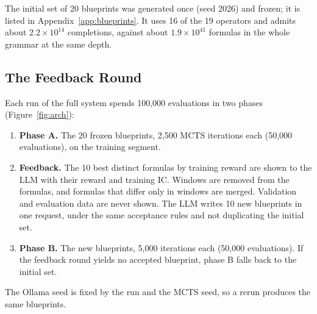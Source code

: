 \documentclass[12pt,a4paper,oneside]{book}
\theoremstyle{definition}
\begin{document}
The initial set of 20 blueprints was generated once (seed 2026) and frozen; it is listed in Appendix~\ref{app:blueprints}. It uses 16 of the 19 operators and admits about $2.2 \times 10^{14}$ completions, against about $1.9 \times 10^{41}$ formulas in the whole grammar at the same depth.

\subsection{The Feedback Round}
\label{sec:feedback}

Each run of the full system spends 100,000 evaluations in two phases (Figure~\ref{fig:arch}):
\begin{enumerate}
  \item \textbf{Phase A.} The 20 frozen blueprints, 2,500 MCTS iterations each (50,000 evaluations), on the training segment.
  \item \textbf{Feedback.} The 10 best distinct formulas by training reward are shown to the LLM with their reward and training IC. Windows are removed from the formulas, and formulas that differ only in windows are merged. Validation and evaluation data are never shown. The LLM writes 10 new blueprints in one request, under the same acceptance rules and not duplicating the initial set.
  \item \textbf{Phase B.} The new blueprints, 5,000 iterations each (50,000 evaluations). If the feedback round yields no accepted blueprint, phase B falls back to the initial set.
\end{enumerate}
The Ollama seed is fixed by the run and the MCTS seed, so a rerun produces the same blueprints.
\end{document}
